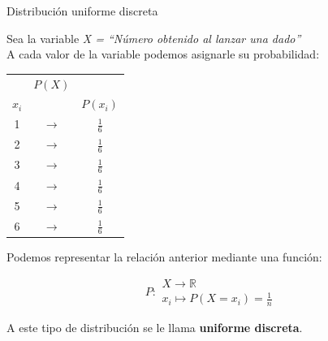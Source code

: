 \documentclass[11pt,handout]{beamer}
\begin{document}
\begin{frame}
{Distribución uniforme discreta}

Sea la variable \emph{X = “Número obtenido al lanzar una dado”}\\
A cada valor de la variable podemos asignarle su probabilidad:


\begin{center}
\begin{tabular}{ccc}
 & $P(X)$ &  \\
$x_i$ &  &  $P(x_i)$\\ \hline 
1 & $\rightarrow$ & $\tfrac{1}{6}$ \\ 
2 & $\rightarrow$ & $\tfrac{1}{6}$ \\ 
3 & $\rightarrow$ & $\tfrac{1}{6}$ \\ 
4 & $\rightarrow$ & $\tfrac{1}{6}$ \\ 
5 & $\rightarrow$ & $\tfrac{1}{6}$ \\ 
6 & $\rightarrow$ & $\tfrac{1}{6}$ \\ 
\end{tabular} 
\end{center}

Podemos representar la relación anterior mediante una función:

%
%

$$P\colon \begin{array}{ll} 
          X \rightarrow \mathbb{R} \\ 
          x_i\mapsto P(X=x_i)=\frac{1}{n} 
         \end{array}$$


A este tipo de distribución se le llama \textbf{uniforme discreta}.
\end{frame}
\end{document}
